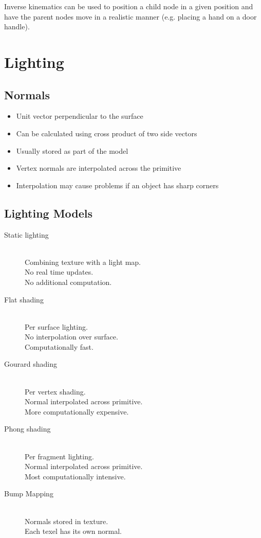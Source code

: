 \documentclass[a4paper]{article}
\begin{document}
Inverse kinematics can be used to position a child node in a given position and
have the parent nodes move in a realistic manner (e.g. placing a hand on a door
handle).

\section{Lighting}

\subsection{Normals}

\begin{itemize}
  \item Unit vector perpendicular to the surface
  \item Can be calculated using cross product of two side vectors
  \item Usually stored as part of the model
  \item Vertex normals are interpolated across the primitive
  \item Interpolation may cause problems if an object has sharp corners
\end{itemize}

\subsection{Lighting Models}

\begin{description}
  \item[Static lighting] \hfill \\
    Combining texture with a light map. \\
    No real time updates. \\
    No additional computation.

  \item[Flat shading] \hfill \\
    Per surface lighting. \\
    No interpolation over surface. \\
    Computationally fast.

  \item[Gourard shading] \hfill \\
    Per vertex shading. \\
    Normal interpolated across primitive. \\
    More computationally expensive.

  \item[Phong shading] \hfill \\
    Per fragment lighting. \\
    Normal interpolated across primitive. \\
    Most computationally intensive.

  \item[Bump Mapping] \hfill \\
    Normals stored in texture. \\
    Each texel has its own normal.

\end{description}
\end{document}
